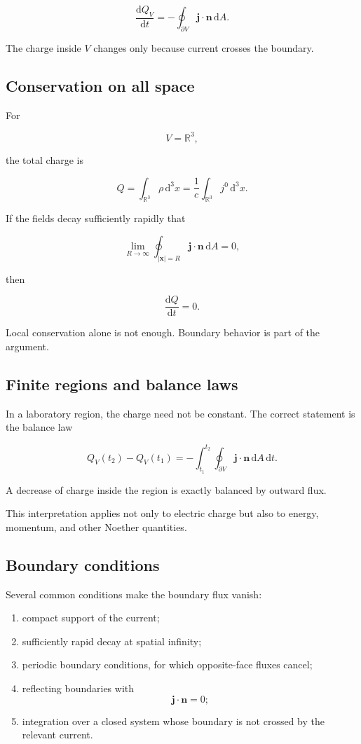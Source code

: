 \[
\boxed{
\frac{\mathrm{d}Q_V}{\mathrm{d}t}
=
-
\oint_{\partial V}
\mathbf{j}\cdot\mathbf{n}
\,\mathrm{d}A
}.
\]

The charge inside \(V\) changes only because current crosses the boundary.

\subsection{Conservation on all space}

For

\[
V=\mathbb{R}^{3},
\]

the total charge is

\[
\boxed{
Q
=
\int_{\mathbb{R}^{3}}
\rho
\,\mathrm{d}^{3}x
=
\frac{1}{c}
\int_{\mathbb{R}^{3}}
j^{0}
\,\mathrm{d}^{3}x
}.
\]

If the fields decay sufficiently rapidly that

\[
\lim_{R\to\infty}
\oint_{|\mathbf{x}|=R}
\mathbf{j}\cdot\mathbf{n}
\,\mathrm{d}A
=
0,
\]

then

\[
\boxed{
\frac{\mathrm{d}Q}{\mathrm{d}t}=0
}.
\]

Local conservation alone is not enough. Boundary behavior is part of the argument.

\subsection{Finite regions and balance laws}

In a laboratory region, the charge need not be constant. The correct statement is the balance law

\[
Q_V(t_2)-Q_V(t_1)
=
-
\int_{t_1}^{t_2}
\oint_{\partial V}
\mathbf{j}\cdot\mathbf{n}
\,\mathrm{d}A\,\mathrm{d}t.
\]

A decrease of charge inside the region is exactly balanced by outward flux.

This interpretation applies not only to electric charge but also to energy, momentum, and other Noether quantities.

\subsection{Boundary conditions}

Several common conditions make the boundary flux vanish:

\begin{enumerate}
    \item compact support of the current;
    \item sufficiently rapid decay at spatial infinity;
    \item periodic boundary conditions, for which opposite-face fluxes cancel;
    \item reflecting boundaries with
    \[
    \mathbf{j}\cdot\mathbf{n}=0;
    \]
    \item integration over a closed system whose boundary is not crossed by the relevant current.
\end{enumerate}


